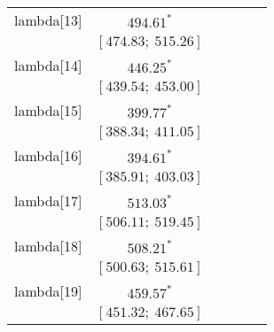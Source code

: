 \begin{table}
\begin{center}
\begin{tabular}{l c c c c c }
lambda[13]  & $494.61^{*}$                     &                           &                           &                         &                         \\
            & $[474.83;\ 515.26]$              &                           &                           &                         &                         \\
lambda[14]  & $446.25^{*}$                     &                           &                           &                         &                         \\
            & $[439.54;\ 453.00]$              &                           &                           &                         &                         \\
lambda[15]  & $399.77^{*}$                     &                           &                           &                         &                         \\
            & $[388.34;\ 411.05]$              &                           &                           &                         &                         \\
lambda[16]  & $394.61^{*}$                     &                           &                           &                         &                         \\
            & $[385.91;\ 403.03]$              &                           &                           &                         &                         \\
lambda[17]  & $513.03^{*}$                     &                           &                           &                         &                         \\
            & $[506.11;\ 519.45]$              &                           &                           &                         &                         \\
lambda[18]  & $508.21^{*}$                     &                           &                           &                         &                         \\
            & $[500.63;\ 515.61]$              &                           &                           &                         &                         \\
lambda[19]  & $459.57^{*}$                     &                           &                           &                         &                         \\
            & $[451.32;\ 467.65]$              &                           &                           &                         &                         \\

\end{tabular}
\end{center}
\end{table}
